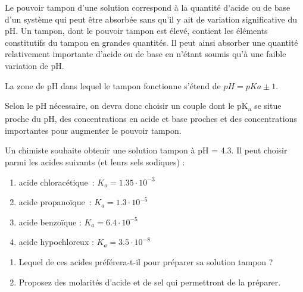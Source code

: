 \documentclass[
  11pt,
  a4paper,
  openany]{book}
\providecommand{\tightlist}{%
  \setlength{\itemsep}{0pt}\setlength{\parskip}{0pt}}
\begin{document}
Le pouvoir tampon d'une solution correspond à la quantité d'acide ou de base d'un système qui peut être absorbée sans qu'il y ait de variation significative du pH. Un tampon, dont le pouvoir tampon est élevé, contient les éléments constitutifs du tampon en grandes quantités. Il peut ainsi absorber une quantité relativement importante d'acide ou de base en n'étant soumis qu'à une faible variation de pH.

La zone de pH dans lequel le tampon fonctionne s'étend de \(pH = pKa \pm 1\).

Selon le pH nécessaire, on devra donc choisir un couple dont le pK\textsubscript{a} se situe proche du pH, des concentrations en acide et base proches et des concentrations importantes pour augmenter le pouvoir tampon.

\clearpage

\begin{Exercise}

Un chimiste souhaite obtenir une solution tampon à pH = 4.3. Il peut choisir parmi les acides suivants (et leurs sels sodiques) :

\begin{enumerate}
\def\labelenumi{\alph{enumi}.}
\tightlist
\item
  acide chloracétique~: \(K_a = 1.35 \cdot 10^{-3}\)
\item
  acide propanoïque~: \(K_a = 1.3 \cdot 10^{-5}\)
\item
  acide benzoïque : \(K_a = 6.4 \cdot 10^{-5}\)
\item
  acide hypochloreux : \(K_a = 3.5 \cdot 10^{-8}\)
\end{enumerate}

\begin{enumerate}
\def\labelenumi{\arabic{enumi}.}
\tightlist
\item
  Lequel de ces acides préférera-t-il pour préparer sa solution tampon ?
\item
  Proposez des molarités d'acide et de sel qui permettront de la préparer.\\
\end{enumerate}

\end{Exercise}
\end{document}
